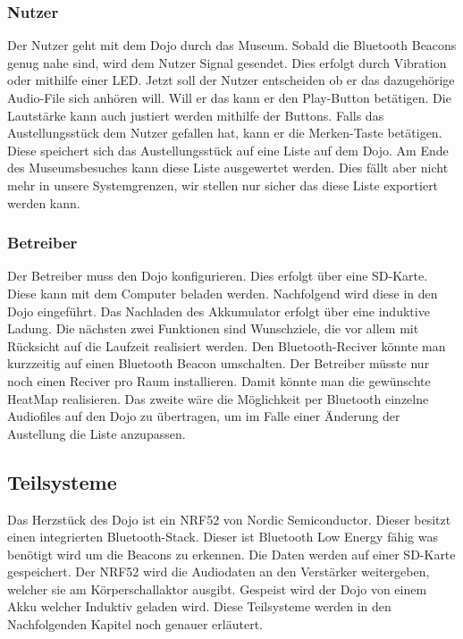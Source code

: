 \subsubsection*{Nutzer}
Der Nutzer geht mit dem Dojo durch das Museum. Sobald die Bluetooth Beacons genug nahe sind, wird dem Nutzer Signal gesendet. Dies erfolgt durch Vibration oder mithilfe einer LED. Jetzt soll der Nutzer entscheiden ob er das dazugehörige Audio-File sich anhören will. Will er das kann er den Play-Button betätigen. Die Lautstärke kann auch justiert werden mithilfe der Buttons. Falls das Austellungsstück dem Nutzer gefallen hat, kann er die Merken-Taste betätigen. Diese speichert sich das Austellungsstück auf eine Liste auf dem Dojo. Am Ende des Museumsbesuches kann diese Liste ausgewertet werden. Dies fällt aber nicht mehr in unsere Systemgrenzen, wir stellen nur sicher das diese Liste exportiert werden kann.
\subsubsection*{Betreiber}
Der Betreiber muss den Dojo konfigurieren. Dies erfolgt über eine SD-Karte. Diese kann mit dem Computer beladen werden. Nachfolgend wird diese in den Dojo eingeführt. Das Nachladen des Akkumulator erfolgt über eine induktive Ladung. Die nächsten zwei Funktionen sind Wunschziele, die vor allem mit Rücksicht auf die Laufzeit realisiert werden. Den Bluetooth-Reciver könnte man kurzzeitig auf einen Bluetooth Beacon umschalten. Der Betreiber müsste nur noch einen Reciver pro Raum installieren. Damit könnte man die gewünschte HeatMap realisieren. Das zweite wäre die Möglichkeit per Bluetooth einzelne Audiofiles auf den Dojo zu übertragen, um im Falle einer Änderung der Austellung die Liste anzupassen.

\subsection{Teilsysteme}
Das Herzstück des Dojo ist ein NRF52 von Nordic Semiconductor. Dieser besitzt einen integrierten Bluetooth-Stack. Dieser ist Bluetooth Low Energy fähig was benötigt wird um die Beacons zu erkennen. Die Daten werden auf einer SD-Karte gespeichert. Der NRF52 wird die Audiodaten an den Verstärker weitergeben, welcher sie am Körperschallaktor ausgibt. Gespeist wird der Dojo von einem Akku welcher Induktiv geladen wird. Diese Teilsysteme werden in den Nachfolgenden Kapitel noch genauer erläutert.

